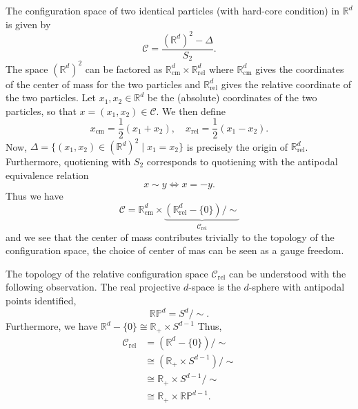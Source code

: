 \documentclass[a4paper,10pt,oneside]{book}
\theoremstyle{plain}
\theoremstyle{definition}
\theoremstyle{remark}
\newcommand{\R}{\mathbb{R}}
\begin{document}
The configuration space of two identical particles (with hard-core condition) in $\mathbb{R}^d$ is given by
\begin{equation}
  \mathcal{C} = \frac{(\R^d)^2 - \Delta}{S_2}.
\end{equation}
The space $(\R^d)^2$ can be factored as $\R^d_\text{cm} \times \R^d_\text{rel}$ where $\R^d_\text{cm}$ gives the coordinates of the center of mass for the two particles and $\R^d_\text{rel}$ gives the relative coordinate of the two particles. Let $x_1, x_2 \in \R^d$ be the (absolute) coordinates of the two particles, so that $x = (x_1, x_2) \in \mathcal{C}$. We then define
\begin{equation}
  x_\text{cm} = \frac{1}{2}(x_1 + x_2), \quad
  x_\text{rel} = \frac{1}{2}(x_1 - x_2).
\end{equation}
Now, $\Delta = \{(x_1, x_2) \in (\R^d)^2 \mid x_1 = x_2\}$ is precisely the origin of $\R^d_\text{rel}$.
Furthermore, quotiening with $S_2$ corresponds to quotiening with the antipodal equivalence relation
\begin{equation}
  x \sim y \iff x = -y.
\end{equation}
Thus we have
\begin{equation}
  \mathcal{C} = \R^d_\text{cm} \times \underbrace{(\R^d_\text{rel} - \{0\}) / {\sim}}_{\mathcal{C}_\text{rel}}
\end{equation}
and we see that the center of mass contributes trivially to the topology of the configuration space, the choice of center of mas can be seen as a gauge freedom.

The topology of the relative configuration space $\mathcal{C}_\text{rel}$ can be understood with the following observation.
The real projective $d$-space is the $d$-sphere with antipodal points identified,
\begin{equation}
  \R\mathbb{P}^d = S^d/{\sim}.
\end{equation}
Furthermore, we have $\mathbb{R}^d-\{0\} \cong \mathbb{R}_+ \times S^{d-1}$ Thus,
\begin{equation}
  \begin{aligned}
    \mathcal{C}_\text{rel}
    &= (\mathbb{R}^d - \{0\})/{\sim} \\
    &\cong (\mathbb{R}_+ \times S^{d-1})/{\sim} \\
    &\cong \mathbb{R}_+ \times S^{d-1}/{\sim} \\
    &\cong \mathbb{R}_+ \times \mathbb{RP}^{d-1}.
  \end{aligned}
\end{equation}
\end{document}
